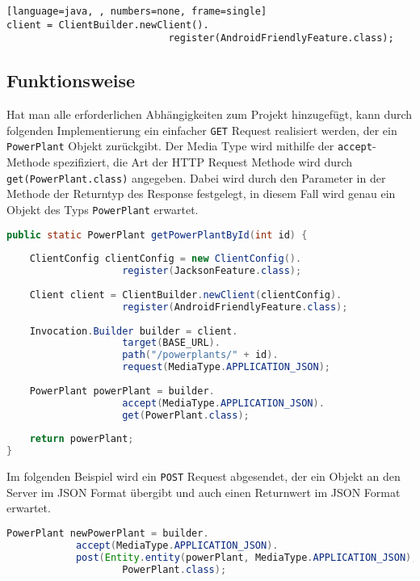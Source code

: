 \begin{lstlisting}[language=java, , numbers=none, frame=single]
client = ClientBuilder.newClient().
							register(AndroidFriendlyFeature.class);
\end{lstlisting}


\subsection{Funktionsweise}
Hat man alle erforderlichen Abhängigkeiten zum Projekt hinzugefügt, kann durch folgenden Implementierung ein einfacher \texttt{GET} Request realisiert werden, der ein \texttt{PowerPlant} Objekt zurückgibt. Der Media Type wird mithilfe der \texttt{accept}-Methode spezifiziert, die Art der HTTP Request Methode wird durch \texttt{get(PowerPlant.class)} angegeben. Dabei wird durch den Parameter in der Methode der Returntyp des Response festgelegt, in diesem Fall wird genau ein Objekt des Typs \texttt{PowerPlant} erwartet. 

\begin{lstlisting}[language=java, caption={GET Request},label={lst:jerseyGET}, escapechar=|, frame=single]
public static PowerPlant getPowerPlantById(int id) {
	
	ClientConfig clientConfig = new ClientConfig().
					register(JacksonFeature.class);
	
	Client client = ClientBuilder.newClient(clientConfig).
					register(AndroidFriendlyFeature.class);
	
	Invocation.Builder builder = client.
					target(BASE_URL).
					path("/powerplants/" + id).
					request(MediaType.APPLICATION_JSON);
	
	PowerPlant powerPlant = builder.
					accept(MediaType.APPLICATION_JSON).
					get(PowerPlant.class);
	
	return powerPlant;
}
\end{lstlisting}

Im folgenden Beispiel wird ein \texttt{POST} Request abgesendet, der ein Objekt an den Server im JSON Format übergibt und auch einen Returnwert im JSON Format erwartet. 
\begin{lstlisting}[language=java, label={lst:jerseyPOST}, escapechar=|,numbers=none, frame=single]
PowerPlant newPowerPlant = builder.
			accept(MediaType.APPLICATION_JSON).
			post(Entity.entity(powerPlant, MediaType.APPLICATION_JSON), 
					PowerPlant.class);

\end{lstlisting}

